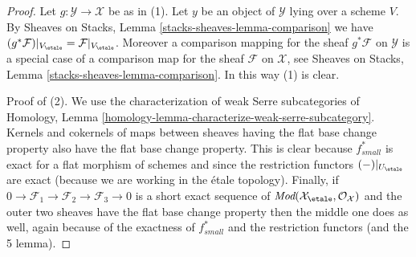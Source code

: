 \begin{proof}
Let $g : \mathcal{Y} \to \mathcal{X}$ be as in (1).
Let $y$ be an object of $\mathcal{Y}$ lying over a scheme $V$. By
Sheaves on Stacks, Lemma \ref{stacks-sheaves-lemma-comparison}
we have
$(g^*\mathcal{F})|_{V_\etale} = \mathcal{F}|_{V_\etale}$.
Moreover a comparison mapping for the sheaf $g^*\mathcal{F}$ on $\mathcal{Y}$
is a special case of a comparison map for the sheaf $\mathcal{F}$ on
$\mathcal{X}$, see
Sheaves on Stacks, Lemma \ref{stacks-sheaves-lemma-comparison}.
In this way (1) is clear.

\medskip\noindent
Proof of (2). We use the characterization of weak Serre subcategories of
Homology, Lemma \ref{homology-lemma-characterize-weak-serre-subcategory}.
Kernels and cokernels of
maps between sheaves having the flat base change property
also have the flat base change property. This is clear because
$f_{small}^*$ is exact for a flat morphism of schemes and since the
restriction functors $(-)|_{U_\etale}$ are exact (because we
are working in the \'etale topology). Finally, if
$0 \to \mathcal{F}_1 \to \mathcal{F}_2 \to \mathcal{F}_3 \to 0$
is a short exact sequence of
$\textit{Mod}(\mathcal{X}_\etale, \mathcal{O}_\mathcal{X})$
and the outer two sheaves have the flat base change property then
the middle one does as well, again because of the exactness of
$f_{small}^*$ and the restriction functors (and the 5 lemma).


\end{proof}

